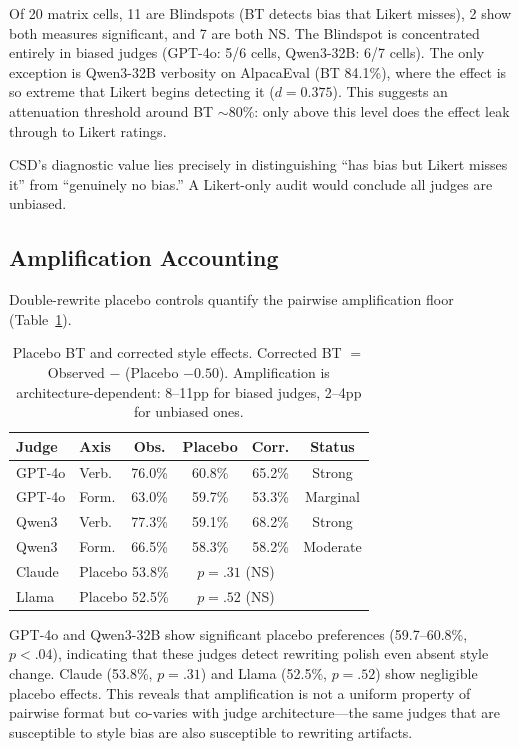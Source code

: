 \documentclass[11pt]{article}
\begin{document}
Of 20 matrix cells, 11 are Blindspots (BT detects bias that Likert misses), 2 show both measures significant, and 7 are both NS. The Blindspot is concentrated entirely in biased judges (GPT-4o: 5/6 cells, Qwen3-32B: 6/7 cells). The only exception is Qwen3-32B verbosity on AlpacaEval (BT 84.1\%), where the effect is so extreme that Likert begins detecting it ($d=0.375$). This suggests an attenuation threshold around BT $\sim$80\%: only above this level does the effect leak through to Likert ratings.

CSD's diagnostic value lies precisely in distinguishing ``has bias but Likert misses it'' from ``genuinely no bias.'' A Likert-only audit would conclude all judges are unbiased.

\subsection{Amplification Accounting}
\label{sec:amplification}

Double-rewrite placebo controls quantify the pairwise amplification floor (Table~\ref{tab:placebo}).

\begin{table}[t]
\centering
\small
\begin{tabular}{llcccc}
\toprule
\textbf{Judge} & \textbf{Axis} & \textbf{Obs.} & \textbf{Placebo} & \textbf{Corr.} & \textbf{Status} \\
\midrule
GPT-4o & Verb. & 76.0\% & 60.8\% & 65.2\% & Strong \\
GPT-4o & Form. & 63.0\% & 59.7\% & 53.3\% & Marginal \\
Qwen3 & Verb. & 77.3\% & 59.1\% & 68.2\% & Strong \\
Qwen3 & Form. & 66.5\% & 58.3\% & 58.2\% & Moderate \\
\midrule
Claude & \multicolumn{2}{c}{Placebo 53.8\%} & \multicolumn{2}{c}{$p=.31$ (NS)} \\
Llama & \multicolumn{2}{c}{Placebo 52.5\%} & \multicolumn{2}{c}{$p=.52$ (NS)} \\
\bottomrule
\end{tabular}
\caption{Placebo BT and corrected style effects. Corrected BT $=$ Observed $-$ (Placebo $- 0.50$). Amplification is architecture-dependent: 8--11pp for biased judges, 2--4pp for unbiased ones.}
\label{tab:placebo}
\end{table}

GPT-4o and Qwen3-32B show significant placebo preferences (59.7--60.8\%, $p < .04$), indicating that these judges detect rewriting polish even absent style change. Claude (53.8\%, $p=.31$) and Llama (52.5\%, $p=.52$) show negligible placebo effects. This reveals that amplification is not a uniform property of pairwise format but co-varies with judge architecture---the same judges that are susceptible to style bias are also susceptible to rewriting artifacts.
\end{document}
